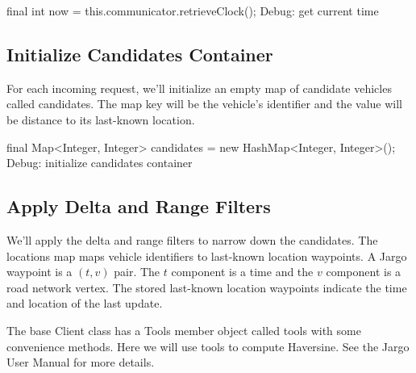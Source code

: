 \nwenddocs{}\endmoddef\nwstartdeflinemarkup{}\nwenddeflinemarkup
final int now = this.communicator.retrieveClock();
\LA{}Debug: get current time~{\nwtagstyle{}}\RA{}
\nwendcode{}\nwdocspar

\subsection{Initialize Candidates Container}

For each incoming request, we'll initialize an empty map of candidate vehicles
called {\Tt{}candidates\nwendquote}. The map key will be the vehicle's identifier and the
value will be distance to its last-known location.

\nwenddocs{}\endmoddef\nwstartdeflinemarkup{}\nwenddeflinemarkup
final Map<Integer, Integer> candidates = new HashMap<Integer, Integer>();
\LA{}Debug: initialize candidates container~{\nwtagstyle{}}\RA{}
\nwendcode{}\nwdocspar

\subsection{Apply Delta and Range Filters}

We'll apply the delta and range filters to narrow down the candidates. The
{\Tt{}locations\nwendquote} map maps vehicle identifiers to last-known location waypoints. A
Jargo waypoint is a $(t,v)$ pair. The $t$ component is a time and the $v$
component is a road network vertex. The stored last-known location waypoints
indicate the time and location of the last update.

The base {\Tt{}Client\nwendquote} class has a {\Tt{}Tools\nwendquote} member object called {\Tt{}tools\nwendquote} with
some convenience methods. Here we will use {\Tt{}tools\nwendquote} to compute Haversine.  See
the Jargo User Manual for more details.

